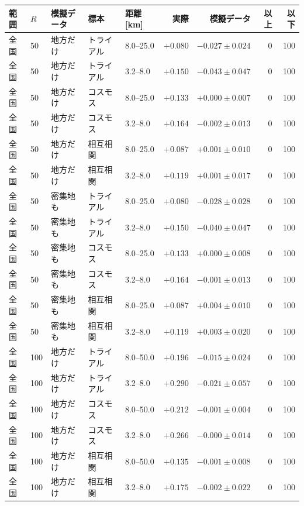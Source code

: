 \begin{tabular}{lllllrrrr}
\toprule
範囲 & $R$ & 模擬データ & 標本 & 距離 [km] & 実際 & 模擬データ & 以上 & 以下 \\
\midrule
全国 & 50 & 地方だけ & トライアル & 8.0--25.0 & $+0.080$ & $-0.027 \pm 0.024$ & 0 & 100 \\
全国 & 50 & 地方だけ & トライアル & 3.2--8.0 & $+0.150$ & $-0.043 \pm 0.047$ & 0 & 100 \\
全国 & 50 & 地方だけ & コスモス & 8.0--25.0 & $+0.133$ & $+0.000 \pm 0.007$ & 0 & 100 \\
全国 & 50 & 地方だけ & コスモス & 3.2--8.0 & $+0.164$ & $-0.002 \pm 0.013$ & 0 & 100 \\
全国 & 50 & 地方だけ & 相互相関 & 8.0--25.0 & $+0.087$ & $+0.001 \pm 0.010$ & 0 & 100 \\
全国 & 50 & 地方だけ & 相互相関 & 3.2--8.0 & $+0.119$ & $+0.001 \pm 0.017$ & 0 & 100 \\
全国 & 50 & 密集地も & トライアル & 8.0--25.0 & $+0.080$ & $-0.028 \pm 0.028$ & 0 & 100 \\
全国 & 50 & 密集地も & トライアル & 3.2--8.0 & $+0.150$ & $-0.040 \pm 0.047$ & 0 & 100 \\
全国 & 50 & 密集地も & コスモス & 8.0--25.0 & $+0.133$ & $+0.000 \pm 0.008$ & 0 & 100 \\
全国 & 50 & 密集地も & コスモス & 3.2--8.0 & $+0.164$ & $-0.001 \pm 0.013$ & 0 & 100 \\
全国 & 50 & 密集地も & 相互相関 & 8.0--25.0 & $+0.087$ & $+0.004 \pm 0.010$ & 0 & 100 \\
全国 & 50 & 密集地も & 相互相関 & 3.2--8.0 & $+0.119$ & $+0.003 \pm 0.020$ & 0 & 100 \\
\midrule
全国 & 100 & 地方だけ & トライアル & 8.0--50.0 & $+0.196$ & $-0.015 \pm 0.024$ & 0 & 100 \\
全国 & 100 & 地方だけ & トライアル & 3.2--8.0 & $+0.290$ & $-0.021 \pm 0.057$ & 0 & 100 \\
全国 & 100 & 地方だけ & コスモス & 8.0--50.0 & $+0.212$ & $-0.001 \pm 0.004$ & 0 & 100 \\
全国 & 100 & 地方だけ & コスモス & 3.2--8.0 & $+0.266$ & $-0.000 \pm 0.014$ & 0 & 100 \\
全国 & 100 & 地方だけ & 相互相関 & 8.0--50.0 & $+0.135$ & $-0.001 \pm 0.008$ & 0 & 100 \\
全国 & 100 & 地方だけ & 相互相関 & 3.2--8.0 & $+0.175$ & $-0.002 \pm 0.022$ & 0 & 100 \\

\end{tabular}
